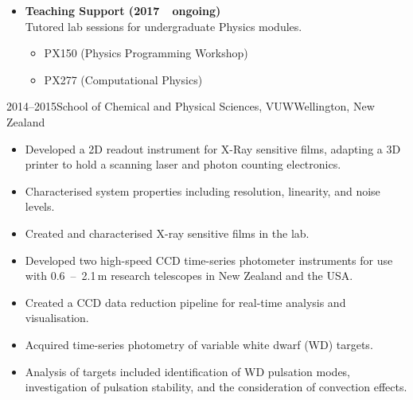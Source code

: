 \documentclass[print]{cv-style}
\begin{document}
\begin{entrylist}
{\begin{itemize}
\begin{itemize}
      \item Authored and contributed to refereed journal papers.
    \end{itemize}
    \item \textbf{Teaching Support (2017~\textendash~ongoing)}\\
    Tutored lab sessions for undergraduate Physics modules.
    \begin{itemize}
      \item PX150 (Physics Programming Workshop)
      \item PX277 (Computational Physics)
    \end{itemize}
  \end{itemize}
}
\entry
  {\small 2014--2015}{School of Chemical and Physical Sciences, VUW}{Wellington, New Zealand}
  {
  \begin{itemize}
    \item Developed a 2D readout instrument for X-Ray sensitive films, adapting a 3D printer to hold a scanning laser and photon counting electronics.
    \item Characterised system properties including resolution, linearity, and noise levels.
    \item Created and characterised X-ray sensitive films in the lab.
  \end{itemize}
}
  {
\begin{itemize}
    \item Developed two high-speed CCD time-series photometer instruments for use with \mbox{0.6~--~2.1\,m} research telescopes in New Zealand and the USA.
    \item Created a CCD data reduction pipeline for real-time analysis and visualisation.
    \item Acquired time-series photometry of variable white dwarf (WD) targets.
    \item Analysis of targets included identification of WD pulsation modes, investigation of pulsation stability, and the consideration of convection effects.
\end{itemize}}

\end{entrylist}
\end{document}
